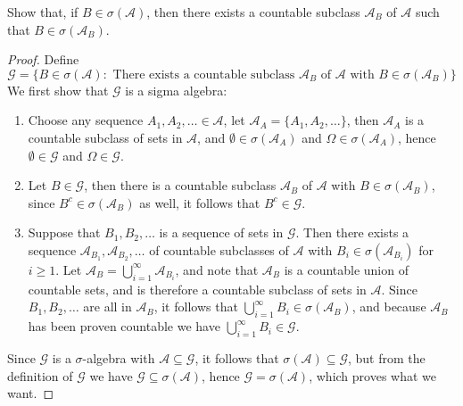 \documentclass[11pt]{article}
\newcommand{\A}{\mathcal{A}}
\newcommand{\G}{\mathcal{G}}
\newcommand{\seq}{\subseteq}
\newcommand{\Om}{\Omega}
\newcommand{\es}{\emptyset}
\newenvironment{exercise}[2][Exercise]{\begin{trivlist}
\item[\hskip \labelsep {\bfseries #1}\hskip \labelsep {\bfseries #2.}]}{\end{trivlist}}
\begin{document}
\begin{exercise}{2.9}
    Show that, if $B \in \sigma (\A)$, then there exists a countable subclass $\A_{B}$ of $\A$ such that $B \in \sigma (\A_{B})$.
\end{exercise}
\begin{proof}
    Define
    \[ \G = \{ B \in \sigma (\A) : \text{ There exists a countable subclass } \A_{B} \text { of } \A \text { with } B \in \sigma (\A_B) \} \]
    We first show that $\G$ is a sigma algebra:
    \begin{enumerate}
        \item Choose any sequence $A_1, A_2, \ldots \in \A$, let $\A_{A} = \{ A_1, A_2, \ldots \}$, then $\A_{A}$ is a countable subclass of sets in $\A$, and $\es \in \sigma (\A_A)$ and $\Om \in \sigma (\A_A)$, hence $\es \in \G$ and $\Om \in \G$.
        \item Let $B \in \G$, then there is a countable subclass $\A_B$ of $\A$ with $B \in \sigma (\A_B)$, since $B^{c} \in \sigma (\A_B)$ as well, it follows that $B^{c} \in \G$.
        \item Suppose that $B_1, B_2, \ldots$ is a sequence of sets in $\G$. Then there exists a sequence $\A_{B_1}, \A_{B_2}, \ldots$ of countable subclasses of $\A$ with $B_i \in \sigma (\A_{B_i})$ for $i \geq 1$. Let $\A_{B} = \bigcup_{i=1}^{\infty} \A_{B_i}$, and note that $\A_B$ is a countable union of countable sets, and is therefore a countable subclass of sets in $\A$. Since $B_1, B_2, \ldots$ are all in $\A_B$, it follows that $\bigcup_{i=1}^{\infty} B_i \in \sigma (\A_B)$, and because $\A_B$ has been proven countable we have $\bigcup_{i=1}^{\infty} B_i \in \G$.
    \end{enumerate}
    Since $\G$ is a $\sigma$-algebra with $\A \seq \G$, it follows that $\sigma (\A) \seq \G$, but from the definition of $\G$ we have $\G \seq \sigma (\A)$, hence $\G = \sigma (\A)$, which proves what we want.
\end{proof}
\end{document}
